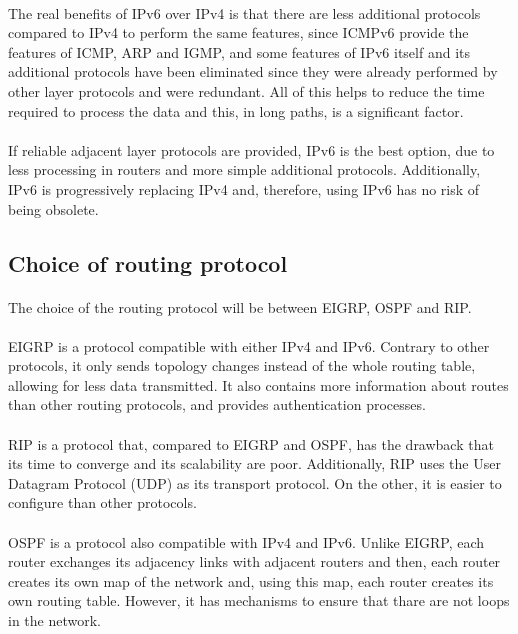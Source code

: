 \documentclass[12pt,a4paper]{report}
\begin{document}
\paragraph{}The real benefits of IPv6 over IPv4 is that there are less additional protocols compared to IPv4 to perform the same features, since ICMPv6 provide the features of ICMP, ARP and IGMP, and some features of IPv6 itself and its additional protocols have been eliminated since they were already performed by other layer protocols and were redundant. All of this helps to reduce the time required to process the data and this, in long paths, is a significant factor.
\paragraph{}If reliable adjacent layer protocols are provided, IPv6 is the best option, due to less processing in routers and more simple additional protocols. Additionally, IPv6 is progressively replacing IPv4 and, therefore, using IPv6 has no risk of being obsolete.

\subsection{Choice of routing protocol}
\paragraph{}The choice of the routing protocol will be between EIGRP, OSPF and RIP.
\paragraph{}EIGRP is a protocol compatible with either IPv4 and IPv6. Contrary to other protocols, it only sends topology changes instead of the whole routing table, allowing for less data transmitted. It also contains more information about routes than other routing protocols, and provides authentication processes.
\paragraph{}RIP is a protocol that, compared to EIGRP and OSPF, has the drawback that its time to converge and its scalability are poor. Additionally, RIP uses the User Datagram Protocol (UDP) as its transport protocol. On the other, it is easier to configure than other protocols.
\paragraph{}OSPF is a protocol also compatible with IPv4 and IPv6. Unlike EIGRP, each router exchanges its adjacency links with adjacent routers and then, each router creates its own map of the network and, using this map, each router creates its own routing table. However, it has mechanisms to ensure that thare are not loops in the network.
\end{document}
